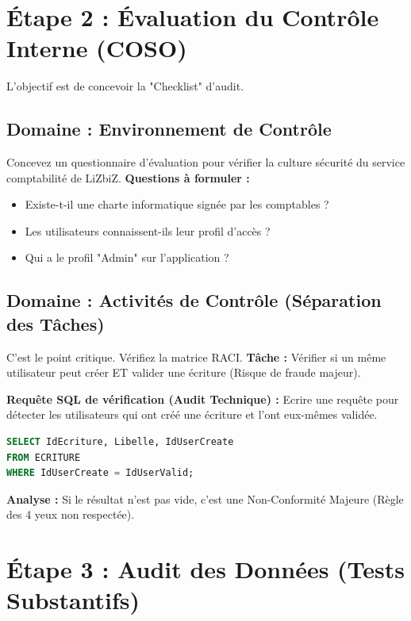 \section{Étape 2 : Évaluation du Contrôle Interne (COSO)}

L'objectif est de concevoir la "Checklist" d'audit.

\subsection{Domaine : Environnement de Contrôle}

Concevez un questionnaire d'évaluation pour vérifier la culture sécurité du service comptabilité de LiZbiZ.
\textbf{Questions à formuler :}
\begin{itemize}
    \item Existe-t-il une charte informatique signée par les comptables ?
    \item Les utilisateurs connaissent-ils leur profil d'accès ?
    \item Qui a le profil "Admin" sur l'application ?
\end{itemize}

\subsection{Domaine : Activités de Contrôle (Séparation des Tâches)}

C'est le point critique. Vérifiez la matrice RACI.
\textbf{Tâche :} Vérifier si un même utilisateur peut créer ET valider une écriture (Risque de fraude majeur).

\begin{boxlizbiz}
\textbf{Requête SQL de vérification (Audit Technique) :}
Ecrire une requête pour détecter les utilisateurs qui ont créé une écriture et l'ont eux-mêmes validée.
\begin{lstlisting}[language=SQL]
SELECT IdEcriture, Libelle, IdUserCreate 
FROM ECRITURE 
WHERE IdUserCreate = IdUserValid;
\end{lstlisting}
\textbf{Analyse :} Si le résultat n'est pas vide, c'est une Non-Conformité Majeure (Règle des 4 yeux non respectée).
\end{boxlizbiz}

\section{Étape 3 : Audit des Données (Tests Substantifs)}


